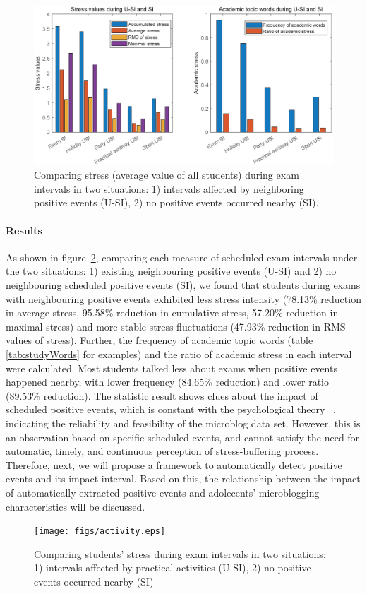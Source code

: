 \begin{figure}[h]
\centering
\includegraphics[width=\linewidth]{figs/barUSI.eps}
\caption{\small{Comparing stress (average value of all students) during exam intervals in two situations:
1) intervals affected by neighboring positive events (U-SI), 2) no positive events occurred nearby (SI).}}
\label{fig:frequency}
\end{figure}

\paragraph{Results}
As shown in figure~\ref{fig:frequency},
comparing each measure of scheduled exam intervals under the two situations:
1) existing neighbouring positive events (U-SI) and 2) no neighbouring scheduled positive events (SI),
we found that students during exams with neighbouring positive events exhibited less stress intensity
(78.13\% reduction in average stress, 95.58\%  reduction in cumulative stress, 57.20\%  reduction in maximal stress)
and more stable stress fluctuations (47.93\% reduction in RMS values of stress). 
Further, the frequency of academic topic words (table \ref{tab:studyWords} for examples)
and the ratio of academic stress in each interval were calculated.
Most students talked less about exams when positive events happened nearby,
with lower frequency (84.65\% reduction) and lower ratio (89.53\% reduction).
The statistic result shows clues about the impact of scheduled positive events,
which is constant with the psychological theory ~\citep{Cohen1984Positive, Cohen2010Positive, Needles1990Positive},
indicating the reliability and feasibility of the microblog data set.
However,
this is an observation based on specific scheduled events,
and cannot satisfy the need for automatic, timely, and continuous perception of stress-buffering process.
Therefore, next, we will propose a framework to automatically detect positive events and its impact interval.
Based on this,
the relationship between the impact of automatically extracted positive events
and adolecents' microblogging characteristics will be discussed.


\begin{figure}
\centering
\texttt{[image: figs/activity.eps]}
\caption{\small{Comparing students' stress during exam intervals in two situations:
1) intervals affected by practical activities (U-SI), 2) no positive events occurred nearby (SI)}}
\label{fig:frequency}
\end{figure}
